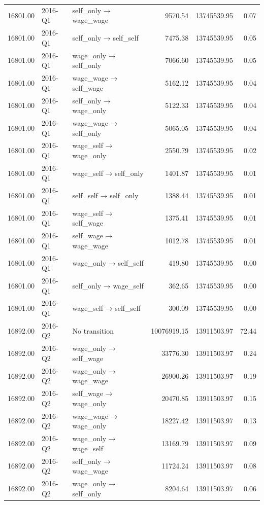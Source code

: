 \begin{table}[ht]
{\begin{tabular}{rllrrr}
  16801.00 & 2016-Q1 & self\_only → wage\_wage & 9570.54 & 13745539.95 & 0.07 \\ 
  16801.00 & 2016-Q1 & self\_only → self\_self & 7475.38 & 13745539.95 & 0.05 \\ 
  16801.00 & 2016-Q1 & wage\_only → self\_only & 7066.60 & 13745539.95 & 0.05 \\ 
  16801.00 & 2016-Q1 & wage\_wage → self\_wage & 5162.12 & 13745539.95 & 0.04 \\ 
  16801.00 & 2016-Q1 & self\_only → wage\_only & 5122.33 & 13745539.95 & 0.04 \\ 
  16801.00 & 2016-Q1 & wage\_wage → self\_only & 5065.05 & 13745539.95 & 0.04 \\ 
  16801.00 & 2016-Q1 & wage\_self → wage\_only & 2550.79 & 13745539.95 & 0.02 \\ 
  16801.00 & 2016-Q1 & wage\_self → self\_only & 1401.87 & 13745539.95 & 0.01 \\ 
  16801.00 & 2016-Q1 & self\_self → self\_only & 1388.44 & 13745539.95 & 0.01 \\ 
  16801.00 & 2016-Q1 & wage\_self → self\_wage & 1375.41 & 13745539.95 & 0.01 \\ 
  16801.00 & 2016-Q1 & self\_wage → wage\_wage & 1012.78 & 13745539.95 & 0.01 \\ 
  16801.00 & 2016-Q1 & wage\_only → self\_self & 419.80 & 13745539.95 & 0.00 \\ 
  16801.00 & 2016-Q1 & self\_only → wage\_self & 362.65 & 13745539.95 & 0.00 \\ 
  16801.00 & 2016-Q1 & wage\_self → self\_self & 300.09 & 13745539.95 & 0.00 \\ 
  16892.00 & 2016-Q2 & No transition & 10076919.15 & 13911503.97 & 72.44 \\ 
  16892.00 & 2016-Q2 & wage\_only → self\_wage & 33776.30 & 13911503.97 & 0.24 \\ 
  16892.00 & 2016-Q2 & wage\_only → wage\_wage & 26900.26 & 13911503.97 & 0.19 \\ 
  16892.00 & 2016-Q2 & self\_wage → wage\_only & 20470.85 & 13911503.97 & 0.15 \\ 
  16892.00 & 2016-Q2 & wage\_wage → wage\_only & 18227.42 & 13911503.97 & 0.13 \\ 
  16892.00 & 2016-Q2 & wage\_only → wage\_self & 13169.79 & 13911503.97 & 0.09 \\ 
  16892.00 & 2016-Q2 & self\_only → wage\_wage & 11724.24 & 13911503.97 & 0.08 \\ 
  16892.00 & 2016-Q2 & wage\_only → self\_only & 8204.64 & 13911503.97 & 0.06 \\ 

\end{tabular}}
\end{table}

